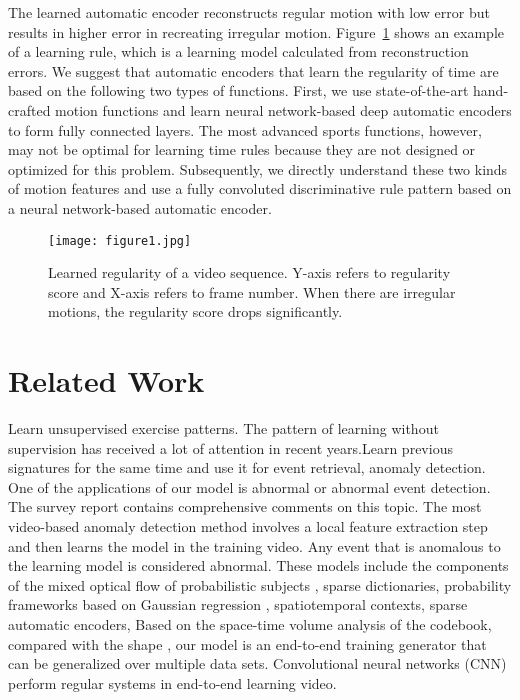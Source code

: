\documentclass[10pt,twocolumn,letterpaper]{article}
\begin{document}
\par The learned automatic encoder reconstructs regular motion with low error but results in higher error in recreating irregular motion. Figure~\ref{pic1} shows an example of a learning rule, which is a learning model calculated from reconstruction errors. We suggest that automatic encoders that learn the regularity of time are based on the following two types of functions. First, we use state-of-the-art hand-crafted motion functions and learn neural network-based deep automatic encoders to form fully connected layers. The most advanced sports functions, however, may not be optimal for learning time rules because they are not designed or optimized for this problem. Subsequently, we directly understand these two kinds of motion features and use a fully convoluted discriminative rule pattern based on a neural network-based automatic encoder.
\begin{figure}
	\centering
	\texttt{[image: figure1.jpg]}
	\caption{ Learned regularity of a video sequence. Y-axis refers
		to regularity score and X-axis refers to frame number. When there
		are irregular motions, the regularity score drops significantly. }\label{pic1}
\end{figure}

\section{Related Work}
Learn unsupervised exercise patterns. The pattern of learning without supervision has received a lot of attention in recent years\cite{Le_2011_Learning}\cite{Jhuang_2007_A}\cite{Taylor_2010_Convolutional}.Learn previous signatures for the same time and use it for event retrieval, anomaly detection. One of the applications of our model is abnormal or abnormal event detection. The survey report contains comprehensive comments on this topic. The most video-based anomaly detection method involves a local feature extraction step and then learns the model in the training video. Any event that is anomalous to the learning model is considered abnormal. These models include the components of the mixed optical flow of probabilistic subjects , sparse dictionaries\cite{Lu_2013_Abnormal}\cite{Zhao_2011_Online}, probability frameworks based on Gaussian regression , spatiotemporal contexts, sparse automatic encoders, Based on the space-time volume analysis of the codebook\cite{Roshtkhari_2013_Online}, compared with the shape , our model is an end-to-end training generator that can be generalized over multiple data sets. Convolutional neural networks (CNN) perform regular systems in end-to-end learning video.
\end{document}
